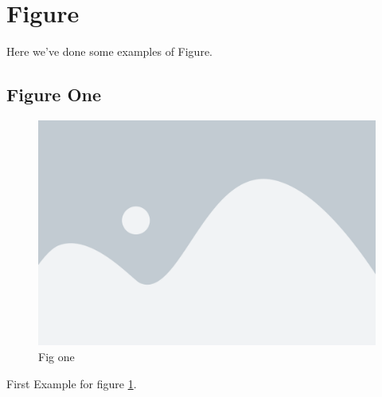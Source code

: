 \section{Figure}
Here we've done some examples of Figure.

\subsection{Figure One}

\begin{figure}[!ht]
  \includegraphics[width=\linewidth]{../images/fig1.png}
  \caption{Fig one}
  \label{fig:figone}
\end{figure}
First Example for figure  \ref{fig:figone}.
\lipsum[1-1]
